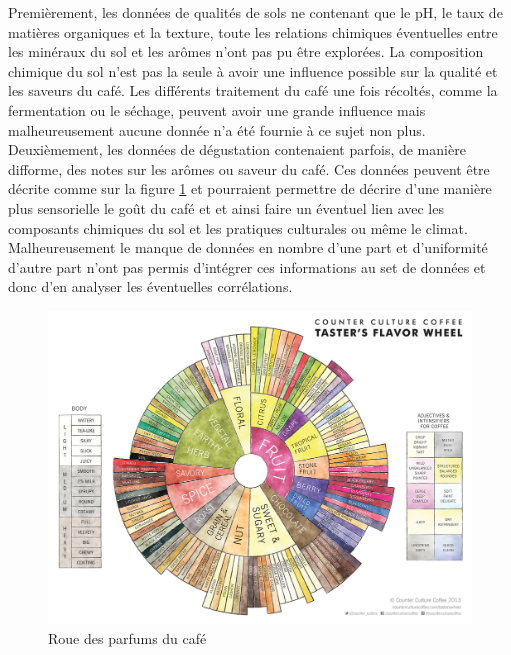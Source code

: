 \noindent Premièrement, les données de qualités de sols ne contenant que le pH, le taux de matières organiques et la texture, toute les relations chimiques éventuelles entre les minéraux du sol et les arômes n'ont pas pu être explorées. La composition chimique du sol n'est pas la seule à avoir une influence possible sur la qualité et les saveurs du café. Les différents traitement du café une fois récoltés, comme la fermentation ou le séchage, peuvent avoir une grande influence mais malheureusement aucune donnée n'a été fournie à ce sujet non plus. \\

\noindent Deuxièmement, les données de dégustation contenaient parfois, de manière difforme, des notes sur les arômes ou saveur du café. Ces données peuvent être décrite comme sur la figure \ref{fig:coffeeflavorwheel} et pourraient permettre de décrire d'une manière plus sensorielle le goût du café et et ainsi faire un éventuel lien avec les composants chimiques du sol et les pratiques culturales ou même le climat. Malheureusement le manque de données en nombre d'une part et d'uniformité d'autre part n'ont pas permis d'intégrer ces informations au set de données et donc d'en analyser les éventuelles corrélations.\\

\begin{figure}[h]
	\centering
	\includegraphics[width=1\linewidth]{img/coffee_flavor_wheel}
	\caption{Roue des parfums du café}
	\label{fig:coffeeflavorwheel}
\end{figure}



